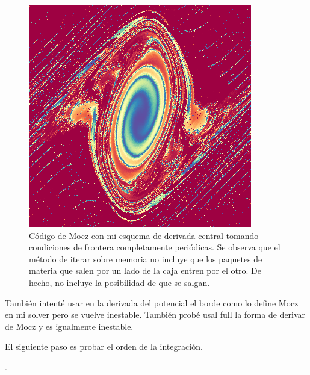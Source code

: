 \documentclass[notitlepage,letterpaper,12pt]{article} %
\begin{document}
\begin{figure}[h]
   \includegraphics[scale= 0.6]{snap90.png}
  \caption{Código de Mocz con mi esquema de derivada central tomando condiciones de frontera completamente periódicas. Se observa que el método de iterar sobre memoria no incluye que los paquetes de materia que salen por un lado de la caja entren por el otro. De hecho, no incluye la posibilidad de que se salgan.}
\end{figure}	


	
También intenté usar en la derivada del potencial el borde como lo define Mocz en mi solver pero se vuelve inestable.
También probé usal full la forma de derivar de Mocz y es igualmente inestable.

El siguiente paso es probar el orden de la integración.







                      





.
\end{document}
